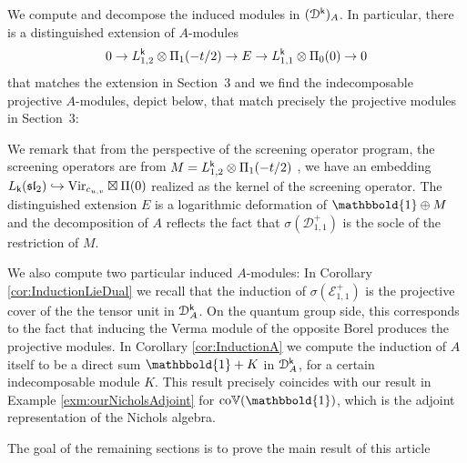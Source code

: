 \documentclass[a4paper, reqno]{amsart}
\theoremstyle{introTheorems}
\newcommand\cD{\mathcal{D}}
\renewcommand\sl{\mathfrak{sl}}
\newcommand\Vir{\textup{Vir}}
\renewcommand{\1}{\mathbbold{1}}
\begin{document}
 We compute and decompose the induced modules in $(\cD^\k)_A$. In particular, there is a distinguished extension of $A$-modules
 $$0\to L^{\mathsf{k}}_{1, 2} \otimes \Pi_{1}(-t/2)\to E\to  L^{\mathsf{k}}_{1, 1} \otimes \Pi_0(0)\to 0$$ 
 that matches the extension in Section~3 and we find the indecomposable projective $A$-modules, depict below, that match precisely the projective modules in Section~3:
  \begin{center}
\end{center}

We remark that from the perspective of the screening operator program, the screening operators are from $M=L^{\mathsf{k}}_{1, 2} \otimes \Pi_{1}(-t/2)$ \cite{A}, we have an embedding  $L_\k(\sl_2)\hookrightarrow \Vir_{c_{u,v}}\boxtimes \Pi(0)$ realized as the kernel of the screening operator.
The distinguished extension $E$ is a logarithmic deformation of $\1\oplus M$ and the decomposition of $A$ reflects the fact that $\sigma(\mathcal{D}^+_{1,1})$ is the socle of the restriction of $M$.


We also compute two particular induced $A$-modules: In Corollary \ref{cor:InductionLieDual} we recall that the induction of $\sigma(\mathcal{E}_{1,1}^+)$ is the projective cover of the the tensor unit in $\cD^\k_A$. On the quantum group side, this corresponds to the fact that inducing the Verma module of the opposite Borel produces the projective modules.  In Corollary \ref{cor:InductionA} we compute the induction of $A$ itself to be a direct sum $\1+K$ in $\cD^\k_A$, for a certain indecomposable module $K$. This result precisely coincides with our result in Example \ref{exm:ourNicholsAdjoint} for $\coLaugwitz(\1)$, which is the adjoint representation of the Nichols algebra.   


\bigskip

The goal of the remaining sections is to prove the main result of this article
\end{document}

